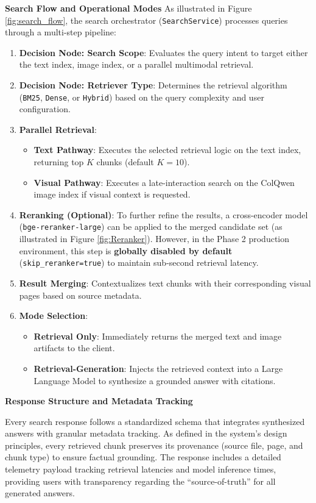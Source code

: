 \textbf{Search Flow and Operational Modes}
As illustrated in Figure \ref{fig:search_flow}, the search orchestrator (\texttt{SearchService}) processes queries through a multi-step pipeline:
\begin{enumerate}
    \item \textbf{Decision Node: Search Scope}: Evaluates the query intent to target either the text index, image index, or a parallel multimodal retrieval.
    \item \textbf{Decision Node: Retriever Type}: Determines the retrieval algorithm (\texttt{BM25}, \texttt{Dense}, or \texttt{Hybrid}) based on the query complexity and user configuration.
    \item \textbf{Parallel Retrieval}:
    \begin{itemize}
        \item \textbf{Text Pathway}: Executes the selected retrieval logic on the text index, returning top $K$ chunks (default $K=10$).
        \item \textbf{Visual Pathway}: Executes a late-interaction search on the ColQwen image index if visual context is requested.
    \end{itemize}
    \item \textbf{Reranking (Optional)}: To further refine the results, a cross-encoder model (\texttt{bge-reranker-large}) can be applied to the merged candidate set (as illustrated in Figure \ref{fig:Reranker}). However, in the Phase 2 production environment, this step is \textbf{globally disabled by default} (\texttt{skip\_reranker=true}) to maintain sub-second retrieval latency.
    \item \textbf{Result Merging}: Contextualizes text chunks with their corresponding visual pages based on source metadata.
    \item \textbf{Mode Selection}:
    \begin{itemize}
        \item \textbf{Retrieval Only}: Immediately returns the merged text and image artifacts to the client.
        \item \textbf{Retrieval-Generation}: Injects the retrieved context into a Large Language Model to synthesize a grounded answer with citations.
    \end{itemize}
\end{enumerate}

\textbf{Response Structure and Metadata Tracking}

Every search response follows a standardized schema that integrates synthesized answers with granular metadata tracking. As defined in the system's design principles, every retrieved chunk preserves its provenance (source file, page, and chunk type) to ensure factual grounding. The response includes a detailed telemetry payload tracking retrieval latencies and model inference times, providing users with transparency regarding the ``source-of-truth'' for all generated answers.

